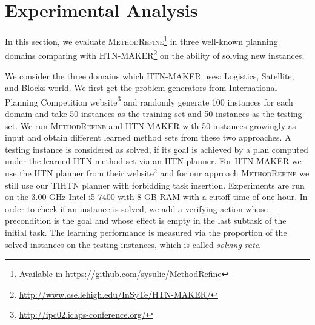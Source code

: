 \documentclass[letterpaper]{article} %
\begin{document}
\section{Experimental Analysis}
In this section, we evaluate \textsc{MethodRefine}\footnote{Available in \url{https://github.com/sysulic/MethodRefine}} in three well-known planning domains %
comparing with HTN-MAKER\footnote{\url{http://www.cse.lehigh.edu/InSyTe/HTN-MAKER/}} on the ability of solving new instances. %


We consider the three domains which HTN-MAKER uses: Logistics, Satellite, and Blocks-world.
We first get the problem generators from  International Planning Competition website\footnote{\url{http://ipc02.icaps-conference.org/}} and randomly generate 100 instances for each domain and take 50 instances as the training set and 50 instances as the testing set.
We run \textsc{MethodRefine} and HTN-MAKER with 50 instances growingly as input and obtain different learned method sets from these two approaches.
A testing instance is considered as solved, if its goal is achieved by a plan computed under the learned HTN method set via an HTN planner.
For HTN-MAKER we use the HTN planner from their website$^2$ and for our approach \textsc{MethodRefine} we still use our TIHTN planner with forbidding task insertion.
Experiments are run on the 3.00 GHz Intel i5-7400 with 8 GB RAM with a cutoff time of one hour.
In order to check if an instance is solved, we add a verifying action whose precondition is the goal and whose effect is empty in the last subtask of the initial task.
The learning performance is measured via the proportion of the solved instances on the testing instances, which is called \emph{solving rate}.
\end{document}
